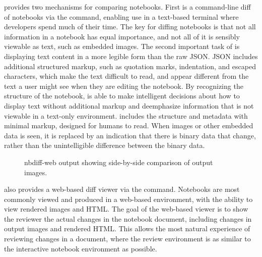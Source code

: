 \documentclass{deliverablereport}
\begin{document}
\nbdime provides two mechanisms for comparing notebooks. First is a command-line diff of notebooks
via the \nbdiff command, enabling use in a text-based terminal where developers spend much
of their time. The key for diffing notebooks is that not all information in a notebook has equal
importance, and not all of it is sensibly viewable as text, such as embedded images. The second
important task of \nbdime is displaying text content in a more legible form than the raw JSON. JSON
includes additional structured markup, such as quotation marks, indentation, and escaped
characters, which make the text difficult to read, and appear different from the text a user might
see when they are editing the notebook. By recognizing the structure of the notebook, \nbdime is
able to make intelligent decisions about how to display text without additional markup and deemphasize information that is not viewable in a text-only environment.
\nbdime includes the structure and metadata with minimal markup, designed for humans to read.
When images or other embedded data is seen, it is replaced by an indication that there is binary data that change, rather than the unintelligible difference between the binary data.

\begin{figure}
    \center
    \caption{nbdiff-web output showing side-by-side comparison of output images.}
    \label{fig:nbdiff-web}
\end{figure}

\nbdime also provides a web-based diff viewer via the  command. Notebooks are
most commonly viewed and produced in a web-based environment, with the ability to view rendered
images and HTML. The goal of the web-based viewer is to show the reviewer the actual changes in the
notebook document, including changes in output images and rendered HTML.
This allows the most natural experience of reviewing changes in a document, where the review environment is as similar to the interactive notebook environment as possible.
\end{document}
